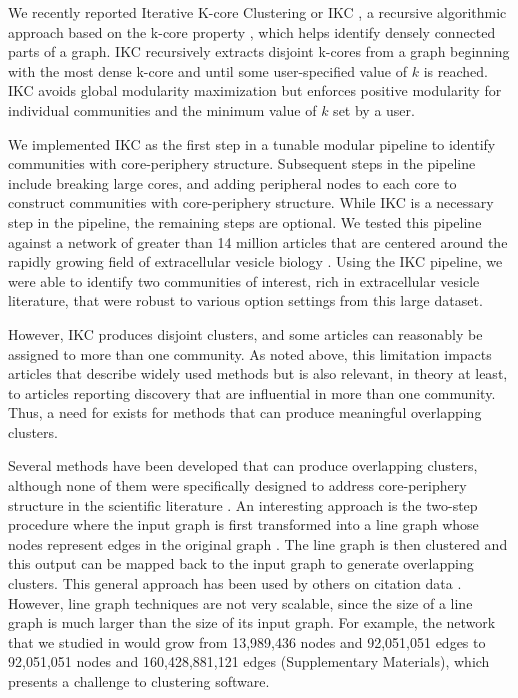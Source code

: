 \documentclass[12pt, oneside]{article}   	%
\begin{document}
	We recently reported Iterative K-core Clustering or IKC \citep{Wedell2022}, a recursive algorithmic approach based on the k-core property \citep{Giatsidis2011,malliaros2019}, which helps identify densely connected parts of a graph. IKC recursively extracts disjoint k-cores from a graph beginning with the most dense  k-core and until some user-specified value of $k$ is reached. IKC avoids global modularity maximization \citep{lancichinetti2011limits} but enforces positive modularity for individual communities and the minimum value of $k$ set by a user. 
	
	We implemented IKC as the first step in a tunable modular pipeline to identify communities with core-periphery structure. Subsequent steps in the pipeline include breaking large cores, and adding peripheral nodes to each core to construct communities with core-periphery structure. While IKC is a necessary step in the pipeline, the remaining steps are optional. We tested this pipeline against a network of greater than 14 million articles that are centered around the rapidly growing field of extracellular vesicle biology \citep{Wedell2022}. Using the IKC pipeline, we were able to identify two communities of interest, rich in extracellular vesicle literature, that were robust to various option settings \citep[Figures 5]{Wedell2022} from this large dataset.
	
	However, IKC produces disjoint clusters, and some articles can reasonably be assigned to more than one community. 
	As noted above, this limitation impacts articles that describe widely used methods but is also relevant, in theory at least, to articles reporting discovery that are influential in more than one community.  Thus, a need for exists for methods that can produce meaningful overlapping clusters. 
	
	Several methods have been developed that can produce overlapping clusters, although none of them were specifically designed to address core-periphery structure in the scientific literature  \citep{Baumes2005,Palla2005,banerjee2005model,Cleuziou2008,Lancichinetti2009,Lu2012}. An interesting approach is the two-step procedure where the input graph is first transformed into a line graph whose nodes represent edges in the original graph \citep{Harary1960}.  The line graph is then clustered and this output can be mapped back to the input graph to generate overlapping clusters. This general approach has been used by others on citation data \citep{Evans2009,Havemann2021}. However, line graph  techniques are not very scalable, since the size of a line graph is much larger than the size of its input graph. For example, the network that we studied in \cite{Wedell2022} would grow from 13,989,436 nodes and 92,051,051 edges to 92,051,051 nodes and 160,428,881,121 edges (Supplementary Materials), which presents a challenge to clustering software.
	
\end{document}
